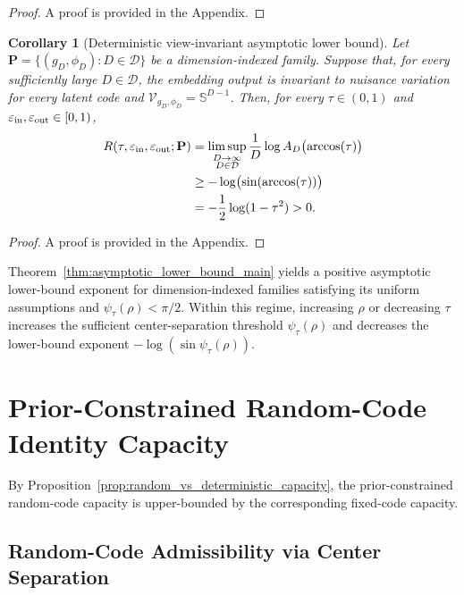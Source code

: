 \documentclass[journal]{IEEEtran}
\def\D{\mathrm{D}} %
\newtheorem{corollary}[theorem]{Corollary}
\begin{document}
\begin{bibunit}
\begin{proof}
A proof is provided in the Appendix.
\end{proof}


\begin{corollary}[Deterministic view-invariant asymptotic lower bound]
\label{cor:deterministic_asymptotic_main}
%
Let $\mathbf P=\{(g_D,\phi_D):D\in\mathcal D\}$ be a dimension-indexed family. Suppose that, for every sufficiently large $D\in\mathcal D$, the embedding output is invariant to nuisance variation for every latent code and $\mathcal V_{g_D,\phi_D}=\mathbb S^{D-1}$. Then, for every $\tau\in(0,1)$ and $\varepsilon_{\rm in},\varepsilon_{\rm out}\in[0,1)$,
%
\begin{align}
R(\tau,\varepsilon_{\rm in},\varepsilon_{\rm out};\mathbf P)
&= \limsup_{\substack{D\to\infty\\D\in\mathcal D}} \frac{1}{D}
\log A_D\bigl(\arccos(\tau)\bigr) \nonumber\\
&\ge -\log \bigl(\sin(\arccos(\tau))\bigr) \nonumber\\
&= -\frac{1}{2}\log(1-\tau^2) >0.
\label{eq:deterministic_asymptotic_rate_main}
\end{align}
%
\end{corollary}

\begin{proof}
A proof is provided in the Appendix.
\end{proof}

Theorem~\ref{thm:asymptotic_lower_bound_main} yields a positive asymptotic lower-bound exponent for dimension-indexed families satisfying its uniform assumptions and $\psi_\tau(\rho)<\pi/2$. Within this regime, increasing $\rho$ or decreasing $\tau$ increases the sufficient center-separation threshold $\psi_\tau(\rho)$ and decreases the lower-bound exponent $-\log(\sin\psi_\tau(\rho))$.


 


\section{Prior-Constrained Random-Code Identity Capacity}
\label{sec:random_code_capacity}

By Proposition~\ref{prop:random_vs_deterministic_capacity}, the prior-constrained random-code capacity is upper-bounded by the corresponding fixed-code capacity.

\subsection{Random-Code Admissibility via Center Separation}


\end{bibunit}
\end{document}

